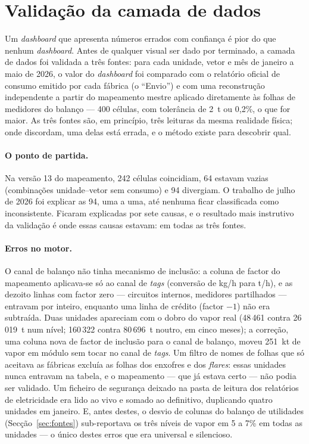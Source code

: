 \section{Validação da camada de dados}
\label{sec:validacao-dados}

Um \emph{dashboard} que apresenta números errados com confiança é pior do
que nenhum \emph{dashboard}. Antes de qualquer visual ser dado por
terminado, a camada de dados foi validada a três fontes: para cada
unidade, vetor e mês de janeiro a maio de 2026, o valor do
\emph{dashboard} foi comparado com o relatório oficial de consumo emitido
por cada fábrica (o ``Envio'') e com uma reconstrução independente a
partir do mapeamento mestre aplicado diretamente às folhas de medidores do
balanço --- 400 células, com tolerância de 2~t ou 0,2\%, o que for maior.
As três fontes são, em princípio, três leituras da mesma realidade física;
onde discordam, uma delas está errada, e o método existe para descobrir
qual.

\paragraph{O ponto de partida.} Na versão 13 do mapeamento, 242 células
coincidiam, 64 estavam vazias (combinações unidade--vetor sem consumo) e
94 divergiam. O trabalho de julho de 2026 foi explicar as 94, uma a uma,
até nenhuma ficar classificada como inconsistente. Ficaram explicadas por
sete causas, e o resultado mais instrutivo da validação é onde essas
causas estavam: em todas as três fontes.

\paragraph{Erros no motor.} O canal de balanço não tinha mecanismo de
inclusão: a coluna de factor do mapeamento aplicava-se só ao canal de
\emph{tags} (conversão de kg/h para t/h), e as dezoito linhas com factor
zero --- circuitos internos, medidores partilhados --- entravam por
inteiro, enquanto uma linha de crédito (factor $-1$) não era subtraída.
Duas unidades apareciam com o dobro do vapor real (48\,461 contra
26\,019~t num nível; 160\,322 contra 80\,696~t noutro, em cinco meses); a
correção, uma coluna nova de factor de inclusão para o canal de balanço,
moveu 251~kt de vapor em módulo sem tocar no canal de \emph{tags}. Um
filtro de nomes de folhas que só aceitava as fábricas excluía as folhas
dos enxofres e dos \emph{flares}: essas unidades nunca entravam na tabela,
e o mapeamento --- que já estava certo --- não podia ser validado. Um
ficheiro de segurança deixado na pasta de leitura dos relatórios de
eletricidade era lido ao vivo e somado ao definitivo, duplicando quatro
unidades em janeiro. E, antes destes, o desvio de colunas do balanço de
utilidades (Secção~\ref{sec:fontes}) sub-reportava os três níveis de vapor
em 5 a 7\% em todas as unidades --- o único destes erros que era
universal e silencioso.


